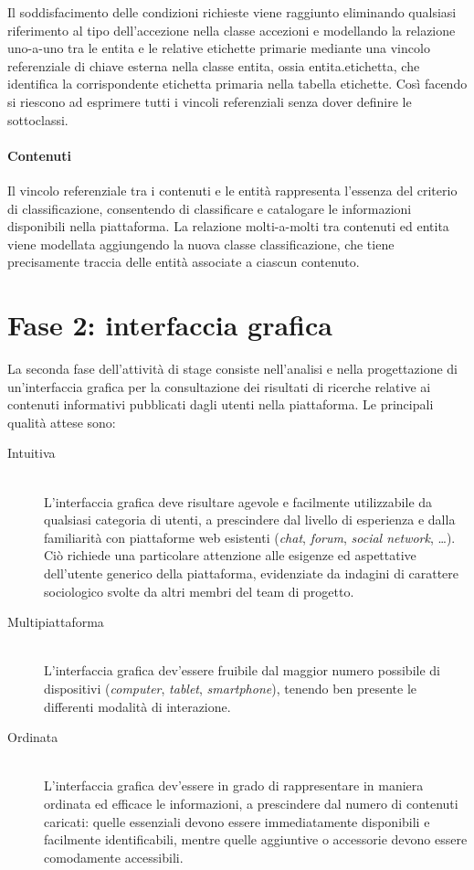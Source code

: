Il soddisfacimento delle condizioni richieste viene raggiunto eliminando qualsiasi riferimento al tipo dell'accezione nella classe \textsf{accezioni} e modellando la relazione uno-a-uno tra le entita e le relative etichette primarie mediante una vincolo referenziale di chiave esterna nella classe \textsf{entita}, ossia \textsf{entita.etichetta}, che identifica la corrispondente etichetta primaria nella tabella \textsf{etichette}. Così facendo si riescono ad esprimere tutti i vincoli referenziali senza dover definire le sottoclassi.

\paragraph{Contenuti}
Il vincolo referenziale tra i contenuti e le entità rappresenta l'essenza del criterio di classificazione, consentendo di classificare e catalogare le informazioni disponibili nella piattaforma. La relazione molti-a-molti tra \textsf{contenuti} ed \textsf{entita} viene modellata aggiungendo la nuova classe \textsf{classificazione}, che tiene precisamente traccia delle entità associate a ciascun contenuto.

\section{Fase 2: interfaccia grafica}
\label{sec:tesi:stage:fase-2}

La seconda fase dell'attività di stage consiste nell'analisi e nella progettazione di un'interfaccia grafica per la consultazione dei risultati di ricerche relative ai contenuti informativi pubblicati dagli utenti nella piattaforma. Le principali qualità attese sono:
\begin{description}
	\item[Intuitiva] \hfill \\
	L'interfaccia grafica deve risultare agevole e facilmente utilizzabile da qualsiasi categoria di utenti, a prescindere dal livello di esperienza e dalla familiarità con piattaforme web esistenti (\textit{chat}, \textit{forum}, \textit{social network}, \ldots). Ciò richiede una particolare attenzione alle esigenze ed aspettative dell'utente generico della piattaforma, evidenziate da indagini di carattere sociologico svolte da altri membri del team di progetto.
	\item[Multipiattaforma] \hfill \\
	L'interfaccia grafica dev'essere fruibile dal maggior numero possibile di dispositivi (\textit{computer}, \textit{tablet}, \textit{smartphone}), tenendo ben presente le differenti modalità di interazione.
	\item[Ordinata] \hfill \\
	L'interfaccia grafica dev'essere in grado di rappresentare in maniera ordinata ed efficace le informazioni, a prescindere dal numero di contenuti caricati: quelle essenziali devono essere immediatamente disponibili e facilmente identificabili, mentre quelle aggiuntive o accessorie devono essere comodamente accessibili.
\end{description}

